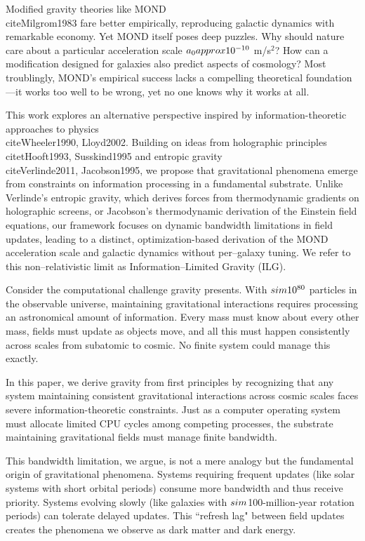 \documentclass[twocolumn,prd,amsmath,amssymb,aps,superscriptaddress,nofootinbib]{revtex4-2}
\begin{document}
Modified gravity theories like MOND \\cite{Milgrom1983} fare better empirically, reproducing galactic dynamics with remarkable economy. Yet MOND itself poses deep puzzles. Why should nature care about a particular acceleration scale $a_0 \\approx 10^{-10}$ m/s$^2$? How can a modification designed for galaxies also predict aspects of cosmology? Most troublingly, MOND's empirical success lacks a compelling theoretical foundation---it works too well to be wrong, yet no one knows why it works at all.

This work explores an alternative perspective inspired by information-theoretic approaches to physics \\cite{Wheeler1990, Lloyd2002}. Building on ideas from holographic principles \\cite{tHooft1993, Susskind1995} and entropic gravity \\cite{Verlinde2011, Jacobson1995}, we propose that gravitational phenomena emerge from constraints on information processing in a fundamental substrate. Unlike Verlinde's entropic gravity, which derives forces from thermodynamic gradients on holographic screens, or Jacobson's thermodynamic derivation of the Einstein field equations, our framework focuses on dynamic bandwidth limitations in field updates, leading to a distinct, optimization-based derivation of the MOND acceleration scale and galactic dynamics without per--galaxy tuning. We refer to this non--relativistic limit as Information--Limited Gravity (ILG).

Consider the computational challenge gravity presents. With $\\sim 10^{80}$ particles in the observable universe, maintaining gravitational interactions requires processing an astronomical amount of information. Every mass must know about every other mass, fields must update as objects move, and all this must happen consistently across scales from subatomic to cosmic. No finite system could manage this exactly.

In this paper, we derive gravity from first principles by recognizing that any system maintaining consistent gravitational interactions across cosmic scales faces severe information-theoretic constraints. Just as a computer operating system must allocate limited CPU cycles among competing processes, the substrate maintaining gravitational fields must manage finite bandwidth.

This bandwidth limitation, we argue, is not a mere analogy but the fundamental origin of gravitational phenomena. Systems requiring frequent updates (like solar systems with short orbital periods) consume more bandwidth and thus receive priority. Systems evolving slowly (like galaxies with $\\sim$100-million-year rotation periods) can tolerate delayed updates. This ``refresh lag" between field updates creates the phenomena we observe as dark matter and dark energy.
\end{document}
